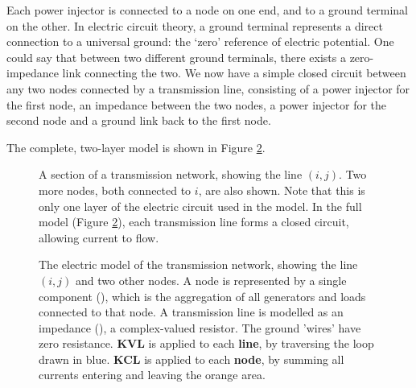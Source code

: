 \documentclass[main.tex]{subfiles}
\begin{document}
Each power injector is connected to a node on one end, and to a ground terminal on the other. In electric circuit theory, a ground terminal represents a direct connection to a universal ground: the `zero' reference of electric potential. One could say that between two different ground terminals, there exists a zero-impedance link connecting the two.
We now have a simple closed circuit between any two nodes connected by a transmission line, consisting of a power injector for the first node, an impedance between the two nodes, a power injector for the second node and a ground link back to the first node.

The complete, two-layer model is shown in Figure \ref{fig:KVLcircuitside}.


\begin{figure}
    \centering
    \begin{adjustbox}{width=.6\textwidth}
    
    \end{adjustbox}
    \caption{A section of a transmission network, showing the line $(i,j)$. Two more nodes, both connected to $i$, are also shown. Note that this is only one layer of the electric circuit used in the model. In the full model (Figure \ref{fig:KVLcircuitside}), each transmission line forms a closed circuit, allowing current to flow.}
    \label{fig:KVLcircuit}
\end{figure}

\begin{figure}
    \centering
    \begin{adjustbox}{width=.9\textwidth}
    
    \end{adjustbox}
    \caption{
    The electric model of the transmission network, showing the line $(i,j)$ and two other nodes. A node is represented by a single component (\inlineac), which is the aggregation of all generators and loads connected to that node. A transmission line is modelled as an impedance (\inlineres), a complex-valued resistor. The ground 'wires' have zero resistance. \protect\newline
    \textbf{KVL} is applied to each \textbf{line}, by traversing the loop drawn in blue.\protect\newline
    \textbf{KCL} is applied to each \textbf{node}, by summing all currents entering and leaving the orange area.}
    \label{fig:KVLcircuitside}
\end{figure}
\end{document}
